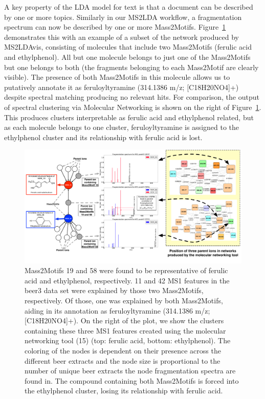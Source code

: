 A key property of the LDA model for text is that a document can be described by one or more topics. Similarly in our MS2LDA workflow, a fragmentation spectrum can now be described by one or more Mass2Motifs. Figure~\ref{fig:m2lda-combined-m2m} demonstrates this with an example of a subset of the network produced by MS2LDAvis, consisting of molecules that include two Mass2Motifs (ferulic acid and ethylphenol). All but one molecule belongs to just one of the Mass2Motifs but one belongs to both (the fragments belonging to each Mass2Motif are clearly visible). The presence of both Mass2Motifs in this molecule allows us to putatively annotate it as feruloyltyramine (314.1386 m/z; [C18H20NO4]+) despite spectral matching producing no relevant hits. For comparison, the output of spectral clustering via Molecular Networking is shown on the right of Figure~\ref{fig:m2lda-combined-m2m}. This produces clusters interpretable as ferulic acid and ethylphenol related, but as each molecule belongs to one cluster, feruloyltyramine is assigned to the ethylphenol cluster and its relationship with ferulic acid is lost. 

\begin{figure}[!htbp]
\centering\includegraphics[width=1.0\linewidth]{07-lda/figures/combinedm2m.pdf}
\centering\caption{Mass2Motifs 19 and 58 were found to be representative of ferulic acid and ethylphenol, respectively. 11 and 42 MS1 features in the beer3 data set were explained by those two Mass2Motifs, respectively. Of those, one was explained by both Mass2Motifs, aiding in its annotation as feruloyltyramine (314.1386 m/z; [C18H20NO4]+). On the right of the plot, we show the clusters containing these three MS1 features created using the molecular networking tool (15) (top: ferulic acid, bottom: ethylphenol). The coloring of the nodes is dependent on their presence across the different beer extracts and the node size is proportional to the number of unique beer extracts the node fragmentation spectra are found in. The compound containing both Mass2Motifs is forced into the ethylphenol cluster, losing its relationship with ferulic acid.\label{fig:m2lda-combined-m2m}}
\end{figure}

